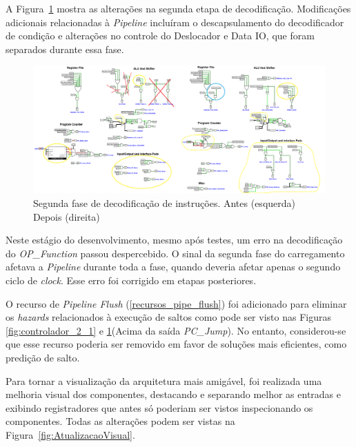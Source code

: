 \documentclass[
	12pt,				%
	openright,			%
	oneside,			%
	a4paper,			%
	english,			%
	french,				%
	spanish,			%
	brazil,				%
	]{abntex2}
\begin{document}
A Figura~\ref{fig:Controlador_2_2} mostra as alterações na segunda etapa de decodificação. Modificações adicionais relacionadas à \textit{Pipeline} incluíram o descapsulamento do decodificador de condição e alterações no controle do Deslocador e Data IO, que foram separados durante essa fase.

\begin{figure}[h]
    \centering
    \includegraphics[width=1\linewidth]{ProcessoDesenvolvimento/Arquitetura/Controlador_2_2.png}
    \caption{Segunda fase de decodificação de instruções. Antes (esquerda) Depois (direita)}
    \label{fig:Controlador_2_2}
\end{figure}

Neste estágio do desenvolvimento, mesmo após testes, um erro na decodificação do \textit{OP\_Function} passou despercebido. O sinal da segunda fase do carregamento afetava a \textit{Pipeline} durante toda a fase, quando deveria afetar apenas o segundo ciclo de \textit{clock}. Esse erro foi corrigido em etapas posteriores.

O recurso de \textit{Pipeline Flush} (\ref{recursos_pipe_flush}) foi adicionado para eliminar os \textit{hazards} relacionados à execução de saltos como pode ser visto nas Figuras \ref{fig:controlador_2_1} e \ref{fig:Controlador_2_2}(Acima da saída \textit{PC\_Jump}). No entanto, considerou-se que esse recurso poderia ser removido em favor de soluções mais eficientes, como predição de salto.

Para tornar a visualização da arquitetura mais amigável, foi realizada uma melhoria visual dos componentes, destacando e separando melhor as entradas e exibindo registradores que antes só poderiam ser vistos inspecionando os componentes. Todas as alterações podem ser vistas na Figura~\ref{fig:AtualizacaoVisual}.
\end{document}

